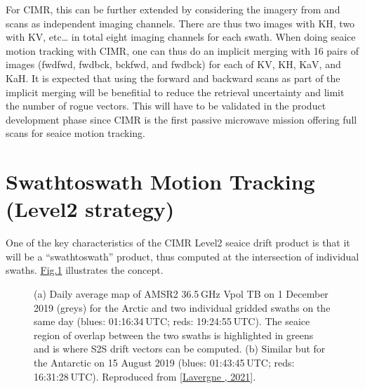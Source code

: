 \documentclass[letterpaper,10pt,english]{jupyterBook}
\begin{document}
\sphinxAtStartPar
For CIMR, this can be further extended by considering the imagery from  and  scans as independent imaging channels. There are thus two images with K\sphinxhyphen{}H, two with K\sphinxhyphen{}V, etc… in
total eight imaging channels for each swath. When doing sea\sphinxhyphen{}ice motion tracking with CIMR, one can thus do an implicit merging with 16 pairs of images (fwd\sphinxhyphen{}fwd, fwd\sphinxhyphen{}bck, bck\sphinxhyphen{}fwd, and fwd\sphinxhyphen{}bck) for each of
K\sphinxhyphen{}V, K\sphinxhyphen{}H, Ka\sphinxhyphen{}V, and Ka\sphinxhyphen{}H. It is expected that using the forward and backward scans as part of the implicit merging will be benefitial to reduce the retrieval uncertainty and limit the number of
rogue vectors. This will have to be validated in the product development phase since CIMR is the first passive microwave mission offering full scans for sea\sphinxhyphen{}ice motion tracking.


\section{Swath\sphinxhyphen{}to\sphinxhyphen{}swath Motion Tracking (Level\sphinxhyphen{}2 strategy)}
\label{\detokenize{background_justification_algorithm:swath-to-swath-motion-tracking-level-2-strategy}}
\sphinxAtStartPar
One of the key characteristics of the CIMR Level\sphinxhyphen{}2 sea\sphinxhyphen{}ice drift product is that it will be a “swath\sphinxhyphen{}to\sphinxhyphen{}swath” product, thus computed at the intersection of individual swaths. \hyperref[\detokenize{background_justification_algorithm:fig-s2s}]{Fig.\@ \ref{\detokenize{background_justification_algorithm:fig-s2s}}} illustrates the concept.

\begin{figure}[htbp]
\centering
\capstart

\noindent{}
\caption{(a) Daily average map of AMSR2 36.5 GHz V\sphinxhyphen{}pol TB on 1 December 2019 (greys) for the Arctic and two individual gridded swaths on the same day (blues: 01:16:34 UTC; reds: 19:24:55 UTC). The sea\sphinxhyphen{}ice region of overlap between the two swaths is highlighted in greens and is where S2S drift vectors can be computed. (b) Similar but for the Antarctic on 15 August 2019 (blues: 01:43:45 UTC; reds: 16:31:28 UTC). Reproduced from {[}\hyperlink{cite.references:id20}{Lavergne , 2021}{]}.}\label{\detokenize{background_justification_algorithm:fig-s2s}}\end{figure}
\end{document}
